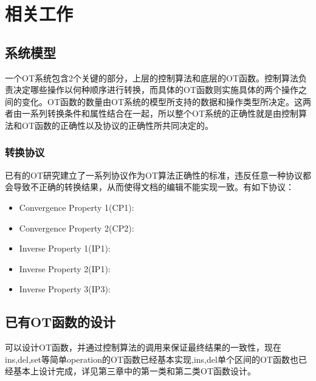 \chapter{相关工作}
\section{系统模型}
	\par 一个OT系统包含2个关键的部分，上层的控制算法和底层的OT函数。控制算法负责决定哪些操作以何种顺序进行转换，而具体的OT函数则实施具体的两个操作之间的变化。OT函数的数量由OT系统的模型所支持的数据和操作类型所决定。这两者由一系列转换条件和属性结合在一起，所以整个OT系统的正确性就是由控制算法和OT函数的正确性以及协议的正确性所共同决定的。
\subsection{转换协议}
	\par 已有的OT研究建立了一系列协议作为OT算法正确性的标准，违反任意一种协议都会导致不正确的转换结果，从而使得文档的编辑不能实现一致。有如下协议：
	\begin{itemize}
	\item Convergence Property 1(CP1):
	\item Convergence Property 2(CP2):
	\item Inverse Property 1(IP1):
	\item Inverse Property 2(IP1):
	\item Inverse Property 3(IP3):
	\end{itemize}
\section{已有OT函数的设计}
	\par 可以设计OT函数，并通过控制算法的调用来保证最终结果的一致性，现在ins,del,set等简单operation的OT函数已经基本实现,ins,del单个区间的OT函数也已经基本上设计完成，详见第三章中的第一类和第二类OT函数设计。
	
	